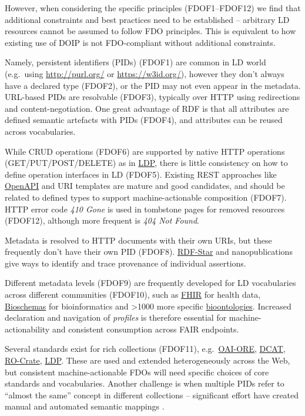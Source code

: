 However, when considering the specific principles (FDOF1--FDOF12) we
find that additional constraints and best practices need to be
established -- arbitrary LD resources cannot be assumed to follow FDO
principles. This is equivalent to how existing use of DOIP is not
FDO-compliant without additional constraints.

Namely, persistent identifiers (PIDs) \cite{McMurry 2017}
(FDOF1) are common in LD world (e.g.~using \url{http://purl.org/} or
\url{https://w3id.org/}), however they don't always have a declared type
(FDOF2), or the PID may not even appear in the metadata. URL-based PIDs
are resolvable (FDOF3), typically over HTTP using redirections and
content-negotiation. One great advantage of RDF is that all attributes
are defined semantic artefacts with PIDs (FDOF4), and attributes can be
reused across vocabularies.

While CRUD operations (FDOF6) are supported by native HTTP operations
(GET/PUT/POST/DELETE) as in \href{https://www.w3.org/TR/ldp/}{LDP},
there is little consistency on how to define operation interfaces in LD
(FDOF5). Existing REST approaches like
\href{https://swagger.io/specification/}{OpenAPI} \cite{OpenAPISpecificationV3} and
URI templates \cite{rfc6570} are mature and
good candidates, and should be related to defined types to support
machine-actionable composition (FDOF7). HTTP error code \emph{410 Gone}
is used in tombstone pages for removed resources (FDOF12), although more
frequent is \emph{404 Not Found}.

Metadata is resolved to HTTP documents with their own URIs, but these
frequently don't have their own PID (FDOF8).
\href{https://w3c.github.io/rdf-star/}{RDF-Star} and nanopublications
\cite{Kuhn 2021} give ways
to identify and trace provenance of individual assertions.

Different metadata levels (FDOF9) are frequently developed for LD
vocabularies across different communities (FDOF10), such as
\href{http://hl7.org/fhir/}{FHIR} for health data,
\href{https://bioschemas.org/}{Bioschemas} for bioinformatics and
\textgreater1000 more specific
\href{https://bioportal.bioontology.org/ontologies}{bioontologies}.
Increased declaration and navigation of \emph{profiles} is therefore
essential for machine-actionability and consistent consumption across
FAIR endpoints.

Several standards exist for rich collections (FDOF11),
e.g.~\href{https://www.openarchives.org/ore/}{OAI-ORE},
\href{https://www.w3.org/TR/vocab-dcat-3/}{DCAT},
\href{https://www.researchobject.org/ro-crate/}{RO-Crate},
\href{https://www.w3.org/TR/ldp/}{LDP}. These are used and extended
heterogeneously across the Web, but consistent machine-actionable FDOs
will need specific choices of core standards and vocabularies. Another
challenge is when multiple PIDs refer to ``almost the same'' concept in
different collections -- significant effort have created manual and
automated semantic mappings \cite{Baker 2013,de Mello 2022}.

